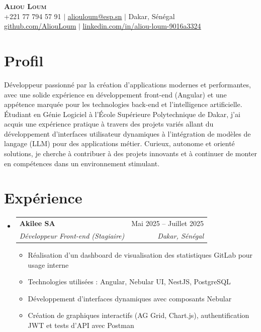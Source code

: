 \documentclass[letterpaper,11pt]{article}
\makeatletter
\newcommand{\resumeItem}[1]{
  \item\small{{#1 \vspace{1pt}}}
}
\newcommand{\resumeSubheading}[4]{
  \vspace{2pt}\item
    \begin{tabular*}{0.97\textwidth}[t]{l@{\extracolsep{\fill}}r}
      \textbf{#1} & #2 \\
      \textit{\small#3} & \textit{\small #4} \\
    \end{tabular*}\vspace{1pt}
}
\newcommand{\resumeSubHeadingListStart}{\begin{itemize}[leftmargin=0.15in, label={}]}
\newcommand{\resumeSubHeadingListEnd}{\end{itemize}\vspace{1pt}}
\newcommand{\resumeItemListStart}{\begin{itemize}[label=\textbullet, itemsep=1pt]}
\newcommand{\resumeItemListEnd}{\end{itemize}\vspace{1pt}}
\makeatother
\begin{document}
\begin{center}
    \textbf{\Huge \scshape Aliou Loum} \\ \vspace{3pt}
    \small +221 77 794 57 91 $|$
    \href{mailto:aliouloum@esp.sn}{\underline{aliouloum@esp.sn}} $|$
    Dakar, S\'en\'egal \\ \vspace{2pt}
    \href{https://github.com/AliouLoum}{\underline{github.com/AliouLoum}} $|$
    \href{https://www.linkedin.com/in/aliou-loum-9016a3324}{\underline{linkedin.com/in/aliou-loum-9016a3324}}
\end{center}

\vspace{2pt}

\section{Profil}
\small{
D\'eveloppeur passionn\'e par la cr\'eation d'applications modernes et performantes, avec une solide exp\'erience en
d\'eveloppement front-end (Angular) et une app\'etence marqu\'ee pour les technologies back-end et l'intelligence artificielle.
\'Etudiant en G\'enie Logiciel \`a l'\'Ecole Sup\'erieure Polytechnique de Dakar, j'ai acquis une exp\'erience pratique \`a travers des
projets vari\'es allant du d\'eveloppement d'interfaces utilisateur dynamiques \`a l'int\'egration de mod\`eles de langage (LLM)
pour des applications m\'etier. Curieux, autonome et orient\'e solutions, je cherche \`a contribuer \`a des projets innovants et \`a
continuer de monter en comp\'etences dans un environnement stimulant.
}

\vspace{4pt}

\section{Exp\'erience}
  \resumeSubHeadingListStart
    \resumeSubheading
      {Akilee SA}{Mai 2025 -- Juillet 2025}
      {D\'eveloppeur Front-end (Stagiaire)}{Dakar, S\'en\'egal}
      \resumeItemListStart
        \resumeItem{R\'ealisation d'un dashboard de visualisation des statistiques GitLab pour usage interne}
        \resumeItem{Technologies utilis\'ees : Angular, Nebular UI, NestJS, PostgreSQL}
        \resumeItem{D\'eveloppement d'interfaces dynamiques avec composants Nebular}
        \resumeItem{Cr\'eation de graphiques interactifs (AG Grid, Chart.js), authentification JWT et tests d'API avec Postman}
      \resumeItemListEnd
  \resumeSubHeadingListEnd
\end{document}
